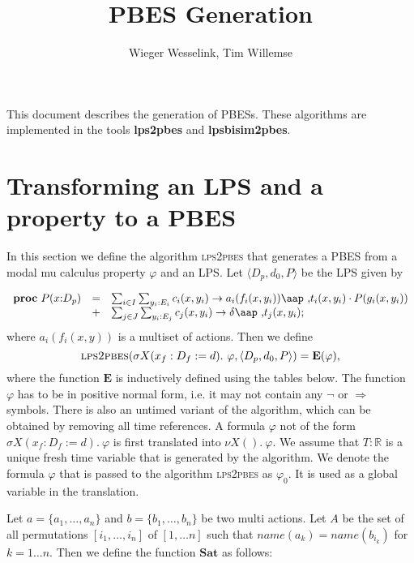 \documentclass{article}
\begin{document}
\title{PBES Generation}
\author{Wieger Wesselink, Tim Willemse}
\maketitle

This document describes the generation of PBESs. These algorithms are implemented in the tools
\textbf{lps2pbes} and \textbf{lpsbisim2pbes}.

\section{Transforming an LPS and a property to a PBES}

In this section we define the algorithm \textsc{lps2pbes} that generates a
PBES from a modal mu calculus property $\varphi$ and an LPS. Let $\langle {D_{p},d_{0},P}\rangle $
be the LPS given by

\begin{equation*}
\begin{array}{lrl}
\mathbf{proc}~P(x{:}D_{p}) & = & \sum_{i\in
I}\sum_{y_{i}:E_{i}}c_{i}(x,y_{i})\rightarrow a_{i}(f_{i}(x,y_{i}))%
\mbox{\aap ,}t_{i}(x,y_{i})\cdot P(g_{i}(x,y_{i})) \\
& + & \sum_{j\in J}\sum_{y_{i}:E_{j}}c_{j}(x,y_{i})\rightarrow \delta %
\mbox{\aap ,}t_{j}(x,y_{i});%
\end{array}%
\end{equation*}%
where $a_{i}(f_{i}(x,y))$ is a multiset of actions. Then we define
\begin{equation*}
\textsc{lps2pbes}(\sigma X(x_{f}:D_{f}:=d).~\varphi ,\langle {%
D_{p},d_{0},P}\rangle )=\mathbf{E}(\varphi ),
\end{equation*}%
where the function $\mathbf{E}$ is inductively defined using the tables
below. The function $\varphi $ has to be in positive normal form, i.e. it
may not contain any $\lnot $ or $\Rightarrow $ symbols. There is also an untimed variant
of the
algorithm, which can be obtained by removing all time references. A formula $
\varphi $ not of the form $\sigma X(x_{f}:D_{f}:=d).~\varphi $ is first
translated into $\nu X().~\varphi $. We assume that $T:\mathbb{R}$ is a
unique fresh time variable that is generated by the algorithm.
We denote the formula $\varphi$ that is passed to the algorithm \textsc{lps2pbes} as $\varphi_0$. It is used as a global variable in the translation.
\vspace{1cm}

Let $a=\{a_{1},\ldots ,a_{n}\}$ and $b=\{b_{1},\ldots ,b_{n}\}$ be two multi
actions. Let $A$ be the set of all permutations $[i_{1},\ldots ,i_{n}]$ of $%
[1,\ldots n]$ such that $name(a_{k})=name(b_{i_{k}})$ for $k=1\ldots n$.
Then we define the function $\mathbf{Sat}$ as follows:
\end{document}

